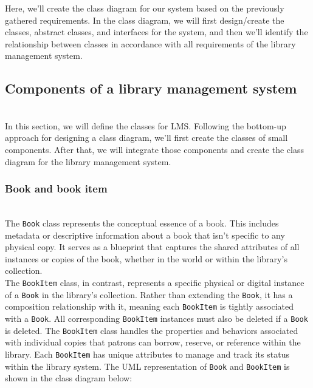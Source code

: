 

Here, we'll create the class diagram for our system based on the previously gathered requirements. In the class diagram, we will first design/create the classes, abstract classes, and interfaces for the system, and then we'll identify the relationship between classes in accordance with all requirements of the library management system.

\subsection{Components of a library management system}\label{JAUOBQIi_DfVKg7jmDVBk}
\\
In this section, we will define the classes for LMS. Following the bottom-up approach for designing a class diagram, we'll first create the classes of small components. After that, we will integrate those components and create the class diagram for the library management system.

\subsubsection{Book and book item}\label{YaHWa-Ru4MUTFL0wY4OEp}
\\
The \texttt{Book} class represents the conceptual essence of a book. This includes metadata or descriptive information about a book that isn't specific to any physical copy. It serves as a blueprint that captures the shared attributes of all instances or copies of the book, whether in the world or within the library's collection.
\\
The \texttt{BookItem} class, in contrast, represents a specific physical or digital instance of a \texttt{Book} in the library's collection. Rather than extending the \texttt{Book}, it has a composition relationship with it, meaning each \texttt{BookItem} is tightly associated with a \texttt{Book}. All corresponding \texttt{BookItem} instances must also be deleted if a \texttt{Book} is deleted. The
\texttt{BookItem} class handles the properties and behaviors associated with individual copies that patrons can borrow, reserve, or reference within the library. Each
\texttt{BookItem} has unique attributes to manage and track its status within the library system. The
UML representation of \texttt{Book} and \texttt{BookItem} is shown in the class diagram below:

